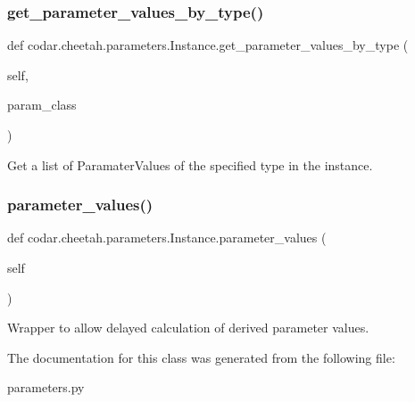 \subsubsection{\texorpdfstring{get\+\_\+parameter\+\_\+values\+\_\+by\+\_\+type()}{get\_parameter\_values\_by\_type()}}
{\footnotesize\ttfamily def codar.\+cheetah.\+parameters.\+Instance.\+get\+\_\+parameter\+\_\+values\+\_\+by\+\_\+type (\begin{DoxyParamCaption}\item[{}]{self,  }\item[{}]{param\+\_\+class }\end{DoxyParamCaption})}

\begin{DoxyVerb}Get a list of ParamaterValues of the specified type in the instance.
\end{DoxyVerb}
 \mbox{\label{classcodar_1_1cheetah_1_1parameters_1_1_instance_a4a943c0f5f3afe8b9a4ff9b238aab766}} 
\subsubsection{\texorpdfstring{parameter\+\_\+values()}{parameter\_values()}}
{\footnotesize\ttfamily def codar.\+cheetah.\+parameters.\+Instance.\+parameter\+\_\+values (\begin{DoxyParamCaption}\item[{}]{self }\end{DoxyParamCaption})}

\begin{DoxyVerb}Wrapper to allow delayed calculation of derived parameter values.\end{DoxyVerb}
 

The documentation for this class was generated from the following file\+:\begin{DoxyCompactItemize}
\item 
parameters.\+py\end{DoxyCompactItemize}
